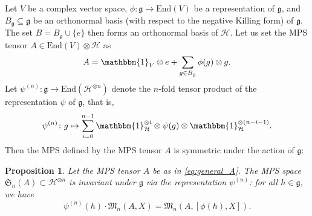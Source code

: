 \documentclass[a4paper]{article}
\newcommand{\id}{\mathbbm{1}}
\newcommand{\End}{\mathrm{End}}
\newtheorem{proposition}[theorem]{Proposition}
\theoremstyle{definition}
\begin{document}
Let $V$ be a complex vector space, $\phi\colon \mathfrak{g}\to \End(V)$ be a representation of $\mathfrak{g}$, and $B_{\mathfrak{g}}\subseteq \mathfrak{g}$ be an orthonormal basis (with respect to the negative Killing form) of $\mathfrak{g}$. The set $B = B_{\mathfrak{g}}\cup \{e\}$ then forms an orthonormal basis of $\mathcal{H}$. Let us set the MPS tensor $A \in \End(V) \otimes \mathcal{H}$ as 
\begin{equation}\label{eq:general_A}
    A = \id_V \otimes e + \sum_{g\in B_{\mathfrak{g}}} \phi(g) \otimes g .     
\end{equation}
Let $\psi^{(n)}\colon \mathfrak{g} \to \End(\mathcal{H}^{\otimes n})$ denote the $n$-fold tensor product of the representation $\psi$ of $\mathfrak{g}$, that is, 
\begin{equation*}
    \psi^{(n)}\colon g \mapsto \sum_{i=0}^{n-1} \id_{\mathcal{H}}^{\otimes i} \otimes \psi(g) \otimes \id_{\mathcal{H}}^{\otimes (n-i-1)}.
\end{equation*}
Then the MPS defined by the MPS tensor $A$ is symmetric under the action of $\mathfrak{g}$:
\begin{proposition}
    Let the MPS tensor $A$ be as in \cref{eq:general_A}. The MPS space $\mathfrak{S}_n(A)\subset \mathcal{H}^{\otimes n}$ is invariant under $\mathfrak{g}$ via the representation $\psi^{(n)}$: for all $h\in\mathfrak{g}$, we have 
    \begin{equation*}\label{eq:GS_covaiance}
        \psi^{(n)}(h) \cdot\mathfrak{M}_n(A,X) = \mathfrak{M}_n(A, [\phi(h),X]).
    \end{equation*}
\end{proposition}
\end{document}
